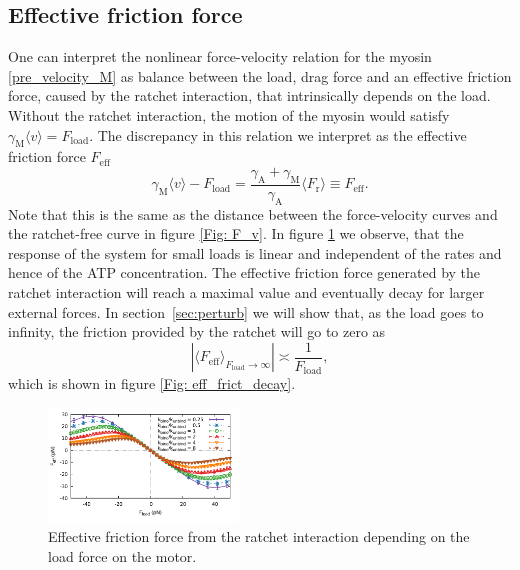 \documentclass[aps,pre,twocolumn,showpacs,showkeys]{revtex4-1}
\begin{document}
\subsection{Effective friction force} 
One can interpret the nonlinear force-velocity relation for the myosin \eqref{pre_velocity_M} as balance between the load, drag force and an effective friction force, caused by the ratchet interaction, 
that intrinsically depends on the load. 
Without the ratchet interaction, the motion of the myosin would satisfy $ \gamma_\text{M}\langle v\rangle = F_\text{load}$. 
The discrepancy in this relation we interpret as the effective friction force $F_\text{eff}$ 
\begin{equation*}
\gamma_\text{M} \langle v \rangle - F_\text{load} = \frac{\gamma_\text{A} + \gamma_\text{M} }{\gamma_\text{A}} \langle F_\text{r} \rangle \equiv F_\text{eff}.
\end{equation*}
Note that this is the same as the distance between the force-velocity curves and the ratchet-free curve in figure \ref{Fig: F_v}.
In figure \ref{Fig: effective_force} we observe, 
that the response of the system for small loads is linear and independent of the rates and hence of the ATP concentration. 
The effective friction force generated by the ratchet interaction will reach a maximal value and eventually decay for larger external forces. 
In section~\ref{sec:perturb} we will show that, as the load goes to infinity, the friction provided by the ratchet will go to zero as 
\begin{equation}
\left| \langle F_\text{eff} \rangle_{F_\text{load}\rightarrow\infty} \right| \asymp \frac{1}{F_\text{load}} , 
\label{eq:eff_vs_load}
\end{equation} 
which is shown in figure \ref{Fig: eff_frict_decay}. 
\begin{figure}[t]
\centering
\includegraphics[width=0.45\textwidth,height=!]{effective_friction}
\caption{Effective friction force from the ratchet interaction depending on the load force on the motor.}
\label{Fig: effective_force}
\end{figure}
\end{document}

